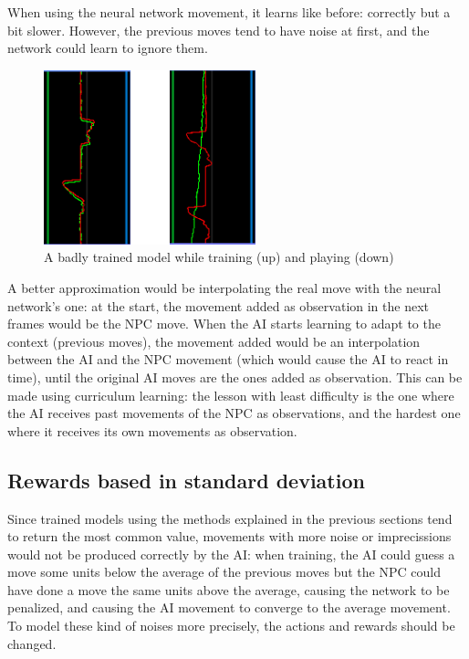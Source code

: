 When using the neural network movement, it learns like before: correctly but a bit slower. However, the previous moves tend to have noise at first, and the network could learn to ignore them.

\begin{figure}[h]
  \centering
		\includegraphics[width=.5\textwidth]{img/graphsMemory.png}
  \caption{A badly trained model while training (up) and playing (down)}
  \label{fig:graphMem}
\end{figure}

A better approximation would be interpolating the real move with the neural network's one: at the start, the movement added as observation in the next frames would be the NPC move. When the AI starts learning to adapt to the context (previous moves), the movement added would be an interpolation between the AI and the NPC movement (which would cause the AI to react in time), until the original AI moves are the ones added as observation. This can be made using curriculum learning: the lesson with least difficulty is the one where the AI receives past movements of the NPC as observations, and the hardest one where it receives its own movements as observation.

\subsection{Rewards based in standard deviation}
\label{sec:stdrew}

Since trained models using the methods explained in the previous sections tend to return the most common value, movements with more noise or imprecissions would not be produced correctly by the AI: when training, the AI could guess a move some units below the average of the previous moves but the NPC could have done a move the same units above the average, causing the network to be penalized, and causing the AI movement to converge to the average movement. To model these kind of noises more precisely, the actions and rewards should be changed.

